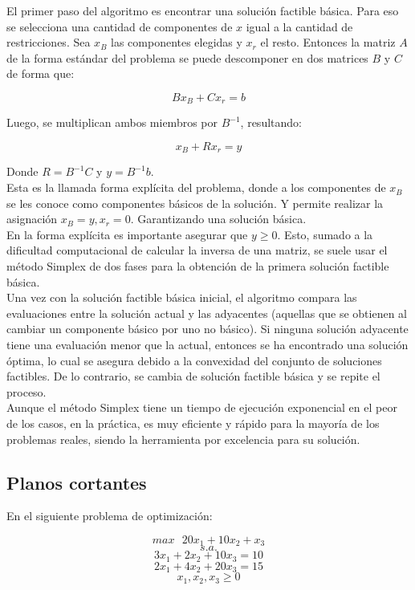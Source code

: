 \documentclass[12pt]{report}
\begin{document}
El primer paso del algoritmo es encontrar una solución factible básica. Para eso se selecciona una cantidad de componentes de $x$ igual a la cantidad de restricciones. Sea $x_B$ las componentes elegidas y $x_r$ el resto. Entonces la matriz $A$ de la forma estándar del problema se puede descomponer en dos matrices $B$ y $C$ de forma que:

$$Bx_B+Cx_r=b$$

Luego, se multiplican ambos miembros por $B^{-1}$, resultando:

$$x_B+Rx_r=y$$

Donde $R=B^{-1}C$ y $y=B^{-1}b$.\\

Esta es la llamada forma explícita del problema, donde a los componentes de $x_B$ se les conoce como componentes básicos de la solución. Y permite realizar la asignación $x_B=y, x_r=0$. Garantizando una solución básica. \\

En la forma explícita es importante asegurar que $y\geq 0$. Esto, sumado a la dificultad computacional de calcular la inversa de una matriz, se suele usar el método Simplex de dos fases para la obtención de la primera solución factible básica.\\

Una vez con la solución factible básica inicial, el algoritmo compara las evaluaciones entre la solución actual y las adyacentes (aquellas que se obtienen al cambiar un componente básico por uno no básico). Si ninguna solución adyacente tiene una evaluación menor que la actual, entonces se ha encontrado una solución óptima, lo cual se asegura debido a la convexidad del conjunto de soluciones factibles. De lo contrario, se cambia de solución factible básica y se repite el proceso.\\

Aunque el método Simplex tiene un tiempo de ejecución exponencial en el peor de los casos, en la práctica, es muy eficiente y rápido para la mayoría de los problemas reales, siendo la herramienta por excelencia para su solución. 

\subsection{Planos cortantes}

En el siguiente problema de optimización:

$$max \text{ } 20x_1+10x_2+x_3$$
$$s.a.$$
$$3x_1+2x_2+10x_3=10$$
$$2x_1+4x_2+20x_3=15$$
$$x_1,x_2,x_3\geq 0$$\\
\end{document}
